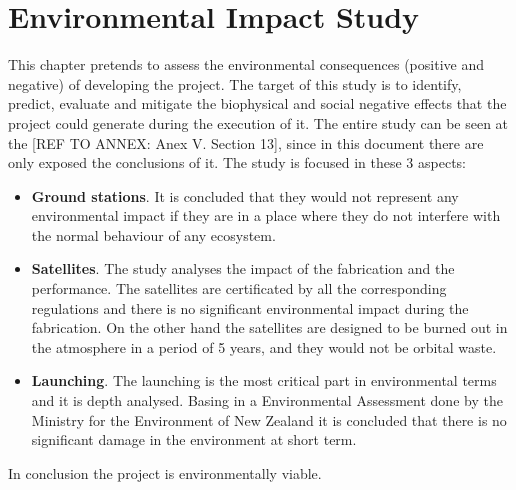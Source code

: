 \chapter{Environmental Impact Study}
This chapter pretends to assess the environmental consequences (positive and negative) of developing the project. The target of this study is to identify, predict, evaluate and mitigate the biophysical and social negative effects that the project could generate during the execution of it. The entire study can be seen at the [{REF TO ANNEX: Anex V. Section 13}], since in this document there are only exposed the conclusions of it.
The study is focused in these 3 aspects:
\begin{itemize}
\item \textbf{Ground stations}. It is concluded that they would not represent any environmental impact if they are in a place where they do not interfere with the normal behaviour of any ecosystem.
\item \textbf{Satellites}. The study analyses the impact of the fabrication and the performance. The satellites are certificated by all the corresponding regulations and there is no significant environmental impact during the fabrication. On the other hand the satellites are designed to be burned out in the atmosphere in a period of 5 years, and they would not be orbital waste.
\item \textbf{Launching}. The launching is the most critical part in environmental terms and it is depth analysed. Basing in a Environmental Assessment done by the Ministry for the Environment of New Zealand \cite{EIS} it is concluded that there is no significant damage in the environment at short term.
\end{itemize}
In conclusion the project is environmentally viable.